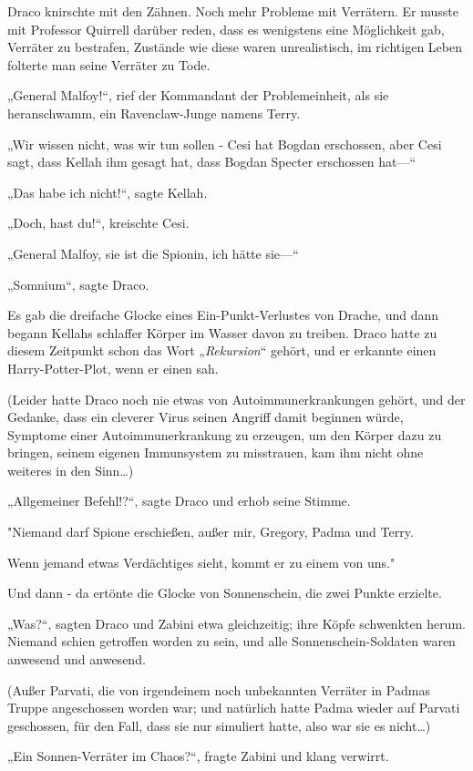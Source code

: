 {Draco knirschte mit den Zähnen. Noch mehr Probleme mit Verrätern. Er musste mit Professor Quirrell darüber reden, dass es wenigstens eine Möglichkeit gab, Verräter zu bestrafen, Zustände wie diese waren unrealistisch, im richtigen Leben folterte man seine Verräter zu Tode.

„General Malfoy!“, rief der Kommandant der Problemeinheit, als sie heranschwamm, ein Ravenclaw-Junge namens Terry.

„Wir wissen nicht, was wir tun sollen - Cesi hat Bogdan erschossen, aber Cesi sagt, dass Kellah ihm gesagt hat, dass Bogdan Specter erschossen hat—“

„Das habe ich nicht!“, sagte Kellah.

„Doch, hast du!“, kreischte Cesi.

„General Malfoy, sie ist die Spionin, ich hätte sie—“

„Somnium“, sagte Draco.

Es gab die dreifache Glocke eines Ein-Punkt-Verlustes von Drache, und dann begann Kellahs schlaffer Körper im Wasser davon zu treiben. Draco hatte zu diesem Zeitpunkt schon das Wort „\emph{Rekursion}“ gehört, und er erkannte einen Harry-Potter-Plot, wenn er einen sah.

(Leider hatte Draco noch nie etwas von Autoimmunerkrankungen gehört, und der Gedanke, dass ein cleverer Virus seinen Angriff damit beginnen würde, Symptome einer Autoimmunerkrankung zu erzeugen, um den Körper dazu zu bringen, seinem eigenen Immunsystem zu misstrauen, kam ihm nicht ohne weiteres in den Sinn…)

„Allgemeiner Befehl!?“, sagte Draco und erhob seine Stimme.

"Niemand darf Spione erschießen, außer mir, Gregory, Padma und Terry.

Wenn jemand etwas Verdächtiges sieht, kommt er zu einem von uns."

Und dann - da ertönte die Glocke von Sonnenschein, die zwei Punkte erzielte.

„Was?“, sagten Draco und Zabini etwa gleichzeitig; ihre Köpfe schwenkten herum. Niemand schien getroffen worden zu sein, und alle Sonnenschein-Soldaten waren anwesend und anwesend.

(Außer Parvati, die von irgendeinem noch unbekannten Verräter in Padmas Truppe angeschossen worden war; und natürlich hatte Padma wieder auf Parvati geschossen, für den Fall, dass sie nur simuliert hatte, also war sie es nicht…)

„Ein Sonnen-Verräter im Chaos?“, fragte Zabini und klang verwirrt.

}

